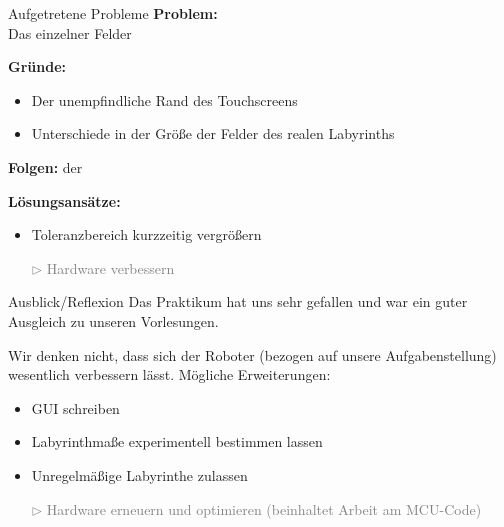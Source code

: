 \documentclass{beamer}
\begin{document}
\begin{frame}[fragile,t]{Aufgetretene Probleme}
\textbf{Problem:}\\
Das  einzelner Felder 

\medskip\noindent
\pause \textbf{Gründe:}
\begin{itemize}[<+->]
\item Der unempfindliche Rand des Touchscreens
\item Unterschiede in der Größe der Felder des realen Labyrinths
\end{itemize}

\medskip\noindent
\pause \textbf{Folgen:}  der 

\medskip\noindent
\pause \textbf{Lösungsansätze:}
\begin{itemize}[<+->]
\item Toleranzbereich kurzzeitig vergrößern
\item[\textcolor{gray}{$\triangleright$}] \textcolor{gray}{Hardware verbessern
}
\end{itemize}
\end{frame}

\begin{frame}[fragile,t]{Ausblick/Reflexion}
Das Praktikum hat uns sehr gefallen und war ein guter Ausgleich zu unseren Vorlesungen.

\medskip\noindent
\pause Wir denken nicht, dass sich der Roboter (bezogen auf unsere Aufgabenstellung) wesentlich verbessern lässt. Mögliche Erweiterungen:
\pause \begin{itemize}[<+->]
\item GUI schreiben
\item Labyrinthmaße experimentell bestimmen lassen
\item Unregelmäßige Labyrinthe zulassen
\item[\textcolor{gray}{$\triangleright$}] \textcolor{gray}{Hardware erneuern und optimieren (beinhaltet Arbeit am MCU-Code)
}
\end{itemize}
\end{frame}


\end{document}
